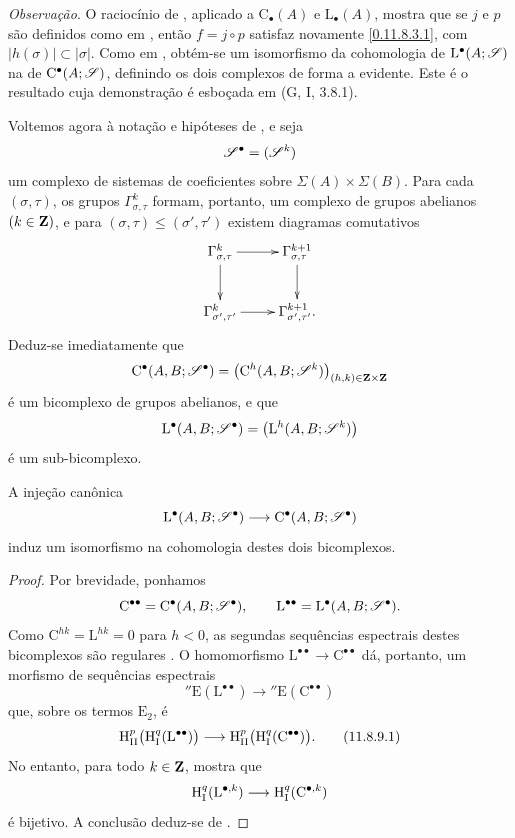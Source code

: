 \begin{env}[11.8.7]
\label{0.11.8.7}
\emph{Observação}.
O raciocínio de , aplicado a
$\mathrm{C}_\bullet(A)$ e $\mathrm{L}_\bullet(A)$, mostra que se
$j$ e $p$ são definidos como em , então
$f=j\circ p$ satisfaz novamente \eqref{0.11.8.3.1}, com
$|h(\sigma)|\subset|\sigma|$.
Como em , obtém-se um isomorfismo da cohomologia de
$\mathrm{L}^\bullet(A;\mathscr{S})$ na de
$\mathrm{C}^\bullet(A;\mathscr{S})$, definindo os dois complexos de forma a
evidente.
Este é o resultado cuja demonstração é esboçada em (G, I, 3.8.1).
\end{env}

\begin{env}[11.8.8]
\label{0.11.8.8}
Voltemos agora à notação e hipóteses de , e seja
\[
  \mathscr{S}^\bullet=(\mathscr{S}^k)
\]
um complexo de sistemas de coeficientes sobre
$\Sigma(A)\times\Sigma(B)$.
Para cada $(\sigma,\tau)$, os grupos $\Gamma^k_{\sigma,\tau}$
formam, portanto, um complexo de grupos abelianos $(k\in\mathbf{Z})$, e para
$(\sigma,\tau)\leq(\sigma',\tau')$ existem diagramas comutativos
\[
  \xymatrix{
    \Gamma^k_{\sigma,\tau}\ar[r]\ar[d] &
    \Gamma^{k+1}_{\sigma,\tau}\ar[d]\\
    \Gamma^k_{\sigma',\tau'}\ar[r] &
    \Gamma^{k+1}_{\sigma',\tau'}.
  }
\]
Deduz-se imediatamente que
\[
  \mathrm{C}^\bullet(A,B;\mathscr{S}^\bullet)
  =
  \bigl(
    \mathrm{C}^h(A,B;\mathscr{S}^k)
  \bigr)_{(h,k)\in\mathbf{Z}\times\mathbf{Z}}
\]
é um bicomplexo de grupos abelianos, e que
\[
  \mathrm{L}^\bullet(A,B;\mathscr{S}^\bullet)
  =
  \bigl(
    \mathrm{L}^h(A,B;\mathscr{S}^k)
  \bigr)
\]
é um sub-bicomplexo.
\end{env}

\begin{proposition}[11.8.9]
\label{0.11.8.9}
A injeção canônica
\[
  \mathrm{L}^\bullet(A,B;\mathscr{S}^\bullet)
  \longrightarrow
  \mathrm{C}^\bullet(A,B;\mathscr{S}^\bullet)
\]
induz um isomorfismo na cohomologia destes dois bicomplexos.
\end{proposition}

\begin{proof}
Por brevidade, ponhamos
\[
  \mathrm{C}^{\bullet\bullet}
  =
  \mathrm{C}^\bullet(A,B;\mathscr{S}^\bullet),
  \qquad
  \mathrm{L}^{\bullet\bullet}
  =
  \mathrm{L}^\bullet(A,B;\mathscr{S}^\bullet).
\]
Como $\mathrm{C}^{hk}=\mathrm{L}^{hk}=0$ para $h<0$, as segundas
sequências espectrais destes bicomplexos são regulares
.
O homomorfismo
$\mathrm{L}^{\bullet\bullet}\to\mathrm{C}^{\bullet\bullet}$ dá, portanto,
um morfismo de sequências espectrais
\[
  {}''\mathrm{E}(\mathrm{L}^{\bullet\bullet})
  \longrightarrow
  {}''\mathrm{E}(\mathrm{C}^{\bullet\bullet})
\]
que, sobre os termos $\mathrm{E}_2$, é
\[
  \HH^p_{\mathrm{II}}
  \bigl(\HH^q_{\mathrm{I}}(\mathrm{L}^{\bullet\bullet})\bigr)
  \longrightarrow
  \HH^p_{\mathrm{II}}
  \bigl(\HH^q_{\mathrm{I}}(\mathrm{C}^{\bullet\bullet})\bigr).
  \tag{11.8.9.1}\label{0.11.8.9.1}
\]
No entanto, para todo $k\in\mathbf{Z}$,  mostra que
\[
  \mathrm{H}^q_{\mathrm{I}}(\mathrm{L}^{\bullet,k})
  \longrightarrow
  \mathrm{H}^q_{\mathrm{I}}(\mathrm{C}^{\bullet,k})
\]
é bijetivo.
A conclusão deduz-se de .
\end{proof}

